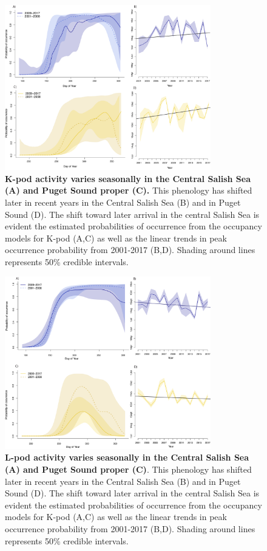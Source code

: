 \documentclass{article}
\begin{document}
\begin{figure}[p]
\includegraphics[width=0.8\textwidth]{../analyses/figures/proboccK_4panels.png} 
\caption{\textbf{K-pod activity varies seasonally in the Central Salish Sea (A) and Puget Sound proper (C).} This phenology has shifted later in recent years in the Central Salish Sea (B) and in Puget Sound (D). The shift toward later arrival in the central Salish Sea is evident the estimated probabilities of occurrence from the occupancy models for K-pod (A,C) as well as the linear trends in peak occurrence probability from 2001-2017 (B,D). Shading around lines represents 50\% credible intervals. 
}
\label{fig:Kprobs}
\end{figure}


\begin{figure}[p]
\includegraphics[width=0.8\textwidth]{../analyses/figures/proboccL_4panels.png} 
\caption{\textbf{L-pod activity varies seasonally in the Central Salish Sea (A) and Puget Sound proper (C)}. This phenology has shifted later in recent years in the Central Salish Sea (B) and in Puget Sound (D). The shift toward later arrival in the central Salish Sea is evident the estimated probabilities of occurrence from the occupancy models for K-pod (A,C) as well as the linear trends in peak occurrence probability from 2001-2017 (B,D). Shading around lines represents 50\% credible intervals. 
}
\label{fig:Lprobs}
\end{figure}

  
\end{document}

